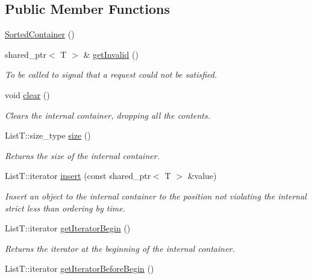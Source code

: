 \subsection*{Public Member Functions}
\begin{DoxyCompactItemize}
\item 
\hyperlink{classmsf__core_1_1SortedContainer_a92fa629150b579414169ce689fa2f168}{Sorted\-Container} ()
\item 
shared\-\_\-ptr$<$ T $>$ \& \hyperlink{classmsf__core_1_1SortedContainer_a9c72942ce59c634559fe7e226b6ab302}{get\-Invalid} ()
\begin{DoxyCompactList}\small\item\em To be called to signal that a request could not be satisfied. \end{DoxyCompactList}\item 
void \hyperlink{classmsf__core_1_1SortedContainer_aea65ad1ff460ab46445b433ea3db49b1}{clear} ()
\begin{DoxyCompactList}\small\item\em Clears the internal container, dropping all the contents. \end{DoxyCompactList}\item 
List\-T\-::size\-\_\-type \hyperlink{classmsf__core_1_1SortedContainer_af51c989973b49002e737190cec67b6b4}{size} ()
\begin{DoxyCompactList}\small\item\em Returns the size of the internal container. \end{DoxyCompactList}\item 
List\-T\-::iterator \hyperlink{classmsf__core_1_1SortedContainer_a8e6ef89431cbcac53439b580a7b8706c}{insert} (const shared\-\_\-ptr$<$ T $>$ \&value)
\begin{DoxyCompactList}\small\item\em Insert an object to the internal container to the position not violating the internal strict less than ordering by time. \end{DoxyCompactList}\item 
List\-T\-::iterator \hyperlink{classmsf__core_1_1SortedContainer_a66c37f04293ec2b3e2fae69ff2ac498e}{get\-Iterator\-Begin} ()
\begin{DoxyCompactList}\small\item\em Returns the iterator at the beginning of the internal container. \end{DoxyCompactList}\item 
List\-T\-::iterator \hyperlink{classmsf__core_1_1SortedContainer_a17fa1667d94905e8def74a65002907ed}{get\-Iterator\-Before\-Begin} ()

\end{DoxyCompactItemize}
